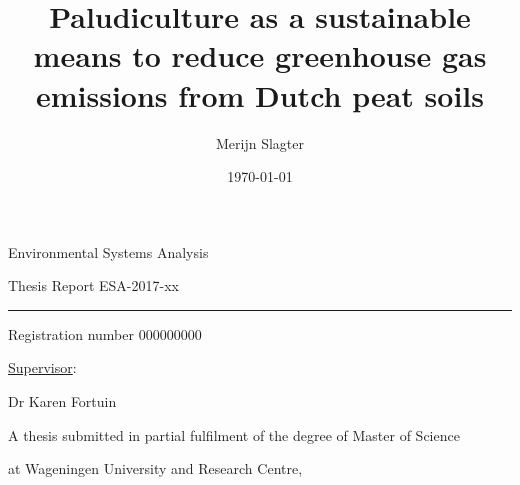 \documentclass[a4paper,12pt]{scrbook}
\title{Paludiculture as a sustainable means to reduce greenhouse gas emissions from Dutch peat soils}
\author{Merijn Slagter}
\date{\today}
\begin{document}
 \begin{titlingpage}
  {\Large Environmental Systems Analysis}\vspace{0.9cm}
  
  {\Large Thesis Report ESA-2017-xx}\vspace{0.9cm}
  
  \hrule\vspace{1.1cm}
  
  {\bfseries \Large \MakeUppercase{\thetitle}}\vspace{2.0cm}
  
%  
  {\Large \theauthor}\vspace{5.5cm}
  
  \vspace{1.5cm}
  
  
  
  \thispagestyle{empty}
  
  \begin{center}
  {\bfseries \Large \thetitle}\vspace{2.7cm}
  
  {\Large \theauthor}\vspace{1.1cm}
  
  {Registration number 000000000}\vspace{3.5cm}
  
  {\large \underline{Supervisor}:}\vspace{1.1cm}
  
  {Dr Karen Fortuin}
  
  \vspace{3.0cm}
  
  {A thesis submitted in partial fulfilment of the degree of Master of Science}
  
  {at Wageningen University and Research Centre,}
  

\end{center}
\end{titlingpage}
\end{document}
